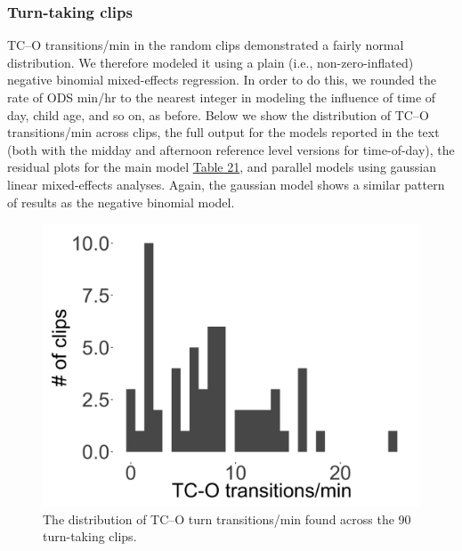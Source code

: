 \documentclass[floatsintext,man]{apa6}
\theoremstyle{definition}
\theoremstyle{definition}
\theoremstyle{definition}
\theoremstyle{remark}
\begin{document}
\newpage

\subsubsection{Turn-taking clips}\label{models-tc_o-turntaking}

TC--O transitions/min in the random clips demonstrated a fairly normal
distribution. We therefore modeled it using a plain (i.e.,
non-zero-inflated) negative binomial mixed-effects regression. In order
to do this, we rounded the rate of ODS min/hr to the nearest integer in
modeling the influence of time of day, child age, and so on, as before.
Below we show the distribution of TC--O transitions/min across clips,
the full output for the models reported in the text (both with the
midday and afternoon reference level versions for time-of-day), the
residual plots for the main model \protect\hyperlink{tab21}{Table 21},
and parallel models using gaussian linear mixed-effects analyses. Again,
the gaussian model shows a similar pattern of results as the negative
binomial model.

\begin{figure}

{\centering \includegraphics[width=0.4\linewidth]{www/c_o_tpm_turntaking_distribution} 

}

\caption{The distribution of TC--O turn transitions/min found across the 90 turn-taking clips.}\label{fig:fig16}
\end{figure}
\end{document}
